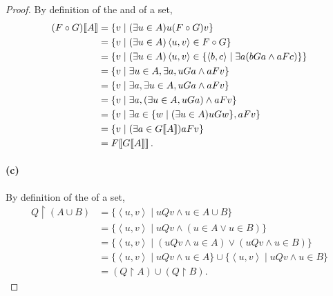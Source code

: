 \documentclass{report}
\newcommand{\pair}[1]{\left< #1 \right>}
\begin{document}
\begin{proof}
    By definition of the  and  of a
      set,
      \begin{align*}
        \img{(F \circ G)}{A}
          & = \{v \mid (\exists u \in A) u(F \circ G)v\} \\
          & = \{v \mid (\exists u \in A) \pair{u, v} \in F \circ G\} \\
          & = \{v \mid (\exists u \in A)
            \pair{u, v} \in \{\pair{b, c} \mid
              \exists a(bGa \land aFc)\}\} \\
          & = \{v \mid \exists u \in A, \exists a, uGa \land aFv\} \\
          & = \{v \mid \exists a, \exists u \in A, uGa \land aFv\} \\
          & = \{v \mid \exists a, (\exists u \in A, uGa) \land aFv\} \\
          & = \{v \mid \exists a \in \{w \mid (\exists u \in A)uGw\}, aFv\} \\
          & = \{v \mid (\exists a \in \img{G}{A}) aFv\} \\
          & = \img{F}{\img{G}{A}}.
      \end{align*}

  \paragraph{(c)}%

    By definition of the  of a set,
      \begin{align*}
        Q \restriction (A \cup B)
          & = \{\pair{u, v} \mid uQv \land u \in A \cup B\} \\
          & = \{\pair{u, v} \mid uQv \land (u \in A \lor u \in B)\} \\
          & = \{\pair{u, v} \mid
            (uQv \land u \in A) \lor (uQv \land u \in B)\} \\
          & = \{\pair{u, v} \mid uQv \land u \in A\} \cup
            \{\pair{u, v} \mid uQv \land u \in B\} \\
          & = (Q \restriction A) \cup (Q \restriction B).
      \end{align*}

\end{proof}

\subsection{}%
\end{document}
